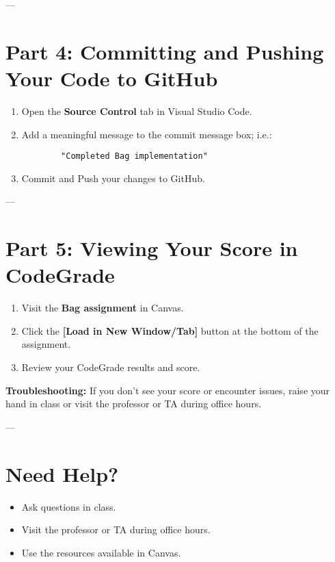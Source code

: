 \documentclass[12pt]{article}
\begin{document}
---

\section*{Part 4: Committing and Pushing Your Code to GitHub}

\begin{enumerate}
    \item Open the \textbf{Source Control} tab in Visual Studio Code.
    \item Add a meaningful message to the commit message box; i.e.:
    \begin{verbatim}
        "Completed Bag implementation"
    \end{verbatim}
    \item Commit and Push your changes to GitHub.
    
\end{enumerate}

---

\section*{Part 5: Viewing Your Score in CodeGrade}

\begin{enumerate}
    \item Visit the \textbf{Bag assignment} in Canvas.
    \item Click the \textbf{[Load in New Window/Tab]} button at the bottom of the assignment.
    \item Review your CodeGrade results and score.
\end{enumerate}

\textbf{Troubleshooting:} If you don’t see your score or encounter issues, raise your hand in class or visit the professor or TA during office hours.

---

\section*{Need Help?}

\begin{itemize}
    \item Ask questions in class.
    \item Visit the professor or TA during office hours.
    \item Use the resources available in Canvas.
\end{itemize}
\end{document}
